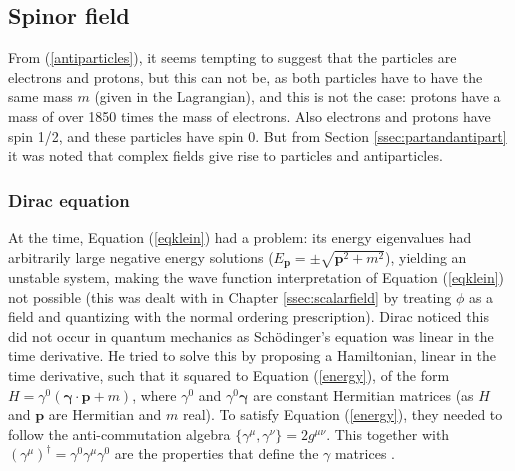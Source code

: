 
\subsection{Spinor field} \label{ssec:spinorfield}

From (\ref{antiparticles}), it seems tempting to suggest that the particles are electrons and protons, but this can not be, as both particles have to have the same mass $m$ (given in the Lagrangian), and this is not the case: protons have a mass of over 1850 times the mass of electrons. Also electrons and protons have spin 1/2, and these particles have spin 0. But from Section \ref{ssec:partandantipart} it was noted that complex fields give rise to particles and antiparticles.

\subsubsection{Dirac equation} \label{ssec:diracequation}

At the time, Equation (\ref{eqklein}) had a problem: its energy eigenvalues had arbitrarily large negative energy solutions ($E_{\bm{p}} = \pm\sqrt{\bm{p}^2 + m^2}$), yielding an unstable system, making the wave function interpretation of Equation (\ref{eqklein}) not possible (this was dealt with in Chapter \ref{ssec:scalarfield} by treating $\phi$ as a field and quantizing with the normal ordering prescription). Dirac noticed this did not occur in quantum mechanics as Schödinger's equation was linear in the time derivative. He tried to solve this by proposing a Hamiltonian, linear in the time derivative, such that it squared to Equation (\ref{energy}), of the form $H = \gamma^0(\bm{\gamma}\cdot \bm{p} +m)$, where $\gamma^0$ and $\gamma^0\bm{\gamma}$ are constant Hermitian matrices (as $H$ and $\bm{p}$ are Hermitian and $m$ real). To satisfy Equation (\ref{energy}), they needed to follow the anti-commutation algebra $\{\gamma^{\mu}, \gamma^{\nu}\} = 2g^{\mu\nu}$. This together with $(\gamma^{\mu})^{\dagger} = \gamma^0\gamma^{\mu}\gamma^0$ are the properties that define the $\gamma$ matrices \cite{Lahiri}.

